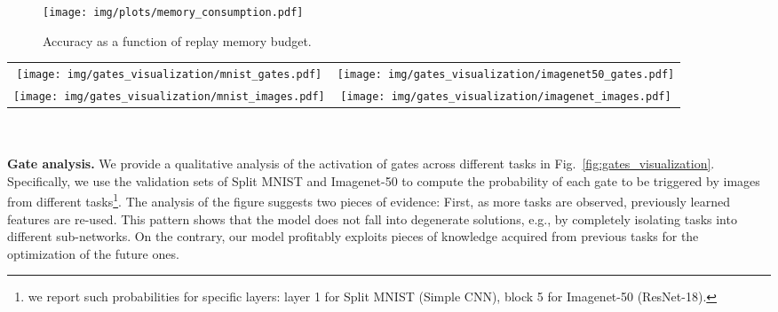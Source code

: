 \documentclass[10pt,twocolumn,letterpaper]{article}
\begin{document}
\begin{table}[t]
\centering
{}
\caption{Class-incremental continual learning results, when replayed examples are provided by a generative model.}
\label{tab:generative_replay}
\end{table} \begin{figure}[b]
    \centering
    \texttt{[image: img/plots/memory\_consumption.pdf]}
    \caption{Accuracy as a function of replay memory budget.}
    \label{fig:memory_consumption}
\end{figure} \begin{figure*}[bth]
\begin{tabular}{cc}
\centering
\texttt{[image: img/gates\_visualization/mnist\_gates.pdf]}&
\texttt{[image: img/gates\_visualization/imagenet50\_gates.pdf]}\\
\texttt{[image: img/gates\_visualization/mnist\_images.pdf]}&
\texttt{[image: img/gates\_visualization/imagenet\_images.pdf]}
\end{tabular}
\caption{Illustration of the gate execution patterns for continually trained models on MNIST (left) and Imagenet-50 (right) datasets. The histograms in the top left and top right show the firing probability of gates in the 1st layer and the 5th residual block respectively. For better illustration, gates are sorted by overall execution rate over all tasks. The bottom-left box shows images from different tasks either triggering or not triggering a specific gate on Split MNIST. The bottom-right box illustrates how - on Imagenet-50 - correlated classes from different tasks fire the same gates (e.g., fishes, different breeds of dogs, birds).}
\label{fig:gates_visualization}
\end{figure*} \\\\
\textbf{Gate analysis.}
We provide a qualitative analysis of the activation of gates across different tasks in Fig.~\ref{fig:gates_visualization}. Specifically, we use the validation sets of Split MNIST and Imagenet-50 to compute the probability of each gate to be triggered by images from different tasks\footnote{we report such probabilities for specific layers: layer 1 for Split MNIST (Simple CNN), block 5 for Imagenet-50 (ResNet-18).}. The analysis of the figure suggests two pieces of evidence: First, as more tasks are observed, previously learned features are re-used. This pattern shows that the model does not fall into degenerate solutions, e.g., by completely isolating tasks into different sub-networks. On the contrary, our model profitably exploits pieces of knowledge acquired from previous tasks for the optimization of the future ones. 
\end{document}

